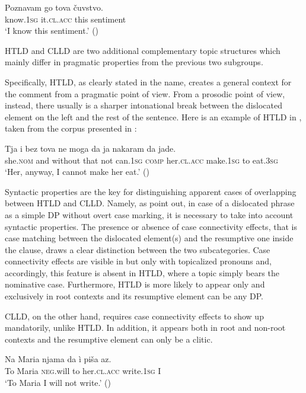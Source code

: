 \documentclass[output=paper,
colorlinks,
citecolor=brown,
newtxmath
]{langscibook}
\begin{document}
\ea\label{ex:zivojinovic:7}
\gll Poznavam go         tova čuvstvo.\\
     know.\textsc{1sg} it.\textsc{cl.acc} this sentiment  \\
\glt `I know this sentiment.'
\hfill ()
\z

\noindent HTLD and CLLD are two additional complementary topic structures which mainly differ in pragmatic properties from the previous two subgroups.

Specifically, HTLD, as clearly stated in the name, creates a general context for the comment from a pragmatic point of view. From a prosodic point of view, instead, there usually is a sharper intonational break between the dislocated element on the left and the rest of the sentence. Here is an example of HTLD in , taken from the corpus presented in \citet{Dzonova2004}:


\ea\label{ex:zivojinovic:8}
\gll Tja	 i	 bez     tova ne  moga	  da ja	        nakaram da jade.\\
     she.\textsc{nom} and without that not can.\textsc{1sg} \textsc{comp} her.\textsc{cl.acc} make.\textsc{1sg} to eat.\textsc{3sg}  \\
\glt `Her, anyway, I cannot make her eat.’ \hfill ()
\z

\largerpage[-1]\noindent Syntactic properties are the key for distinguishing apparent cases of overlapping between HTLD and CLLD. Namely, as \citet{Cinque.Krapova2008} point out, in case of a dislocated phrase as a simple DP without overt case marking, it is necessary to take into account syntactic properties. The presence or absence of case connectivity effects, that is case matching between the dislocated element(s) and the resumptive one inside the clause, draws a clear distinction between the two subcategories. Case connectivity effects are visible in  but only with topicalized pronouns and, accordingly, this feature is absent in HTLD, where a topic simply bears the nominative case. Furthermore, HTLD is more likely to appear only and exclusively in root contexts and its resumptive element can be any DP.

CLLD, on the other hand, requires case connectivity effects to show up mandatorily, unlike HTLD. In addition, it appears both in root and non-root contexts and the resumptive element can only be a clitic.


\ea\label{ex:zivojinovic:9}
\gll Na Maria  njama    da  ì           piša       az.\\
     To Maria  \textsc{neg}.will to  her.\textsc{cl.acc}  write.\textsc{1sg}  I\\
\glt `To Maria I will not write.’
\hfill ()
\z
\end{document}
